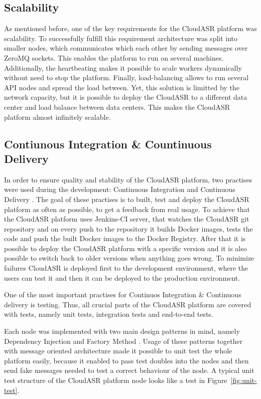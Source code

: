 \subsection{Scalability}
As mentioned before, one of the key requirements for the CloudASR platform was scalability.
To successfully fulfill this requirement architecture was split into smaller nodes,
  which communicates which each other by sending messages over ZeroMQ sockets.
This enables the platform to run on several machines.
Additionally, the heartbeating makes it possible to scale workers dynamically without need to stop the platform.
Finally, load-balancing allows to run several API nodes and spread the load between.
Yet, this solution is limitted by the network capacity,
  but it is possible to deploy the CloudASR to a different data center
  and load balance between data centers.
This makes the CloudASR platform almost infinitely scalable.


\subsection{Contiunous Integration \& Countinuous Delivery}
In order to ensure quality and stability of the CloudASR platform,
  two practises were used during the development:
  Continuous Integration \cite{fowler2006continuous} and Continuous Delivery \cite{humble2010continuous}.
The goal of these practises is to built, test and deploy the CloudASR platform as often as possible,
  to get a feedback from real usage.
To achieve that the CloudASR platform uses Jenkins-CI server,
  that watches the CloudASR git repository
  and on every push to the repository it builds Docker images, tests the code
  and push the built Docker images to the Docker Registry.
After that it is possible to deploy the CloudASR platform with a specific version
  and it is also possible to switch back to older versions when anything goes wrong.
To minimize failures CloudASR is deployed first to the development environment,
  where the users can test it
  and then it can be deployed to the production environment.

One of the most important practises for Continuos Integration \& Continuous delivery is testing.
Thus, all crucial parts of the CloudASR platform are covered with tests, namely unit tests, integration tests and end-to-end tests.

Each node was implemented with two main design patterns in mind, namely Dependency Injection \cite{fowler2004inversion} and Factory Method \cite{gamma1993design}.
Usage of these patterns together with message oriented architecture made it possible to unit test the whole platform easily,
  because it enabled to pass test doubles into the nodes
  and then send fake messages needed to test a correct behaviour of the node.
A typical unit test structure of the CloudASR platform node looks like a test in Figure~\ref{fig:unit-test}.

